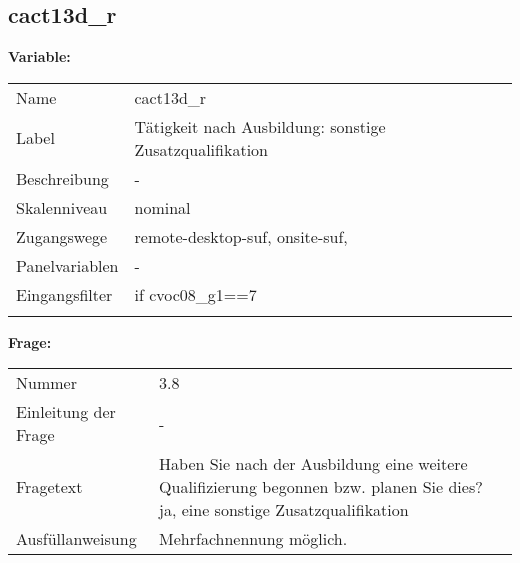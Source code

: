 	
	
	\subsection{cact13d\_r}
	\label{subSection:cact13d_r}

	\noindent\textbf{Variable:}\\
		\begin{tabular}{lL{11.3cm}}
			\label{tableVariable:cact13d_r}
			Name & cact13d\_r \\
			Label & Tätigkeit nach Ausbildung: sonstige Zusatzqualifikation \\
			Beschreibung & - \\
			Skalenniveau & nominal \\
			Zugangswege &
				remote-desktop-suf,
				onsite-suf,
 \\
			Panelvariablen & -
			 \\
			Eingangsfilter & if cvoc08\_g1==7 \\
 \\
		\end{tabular}

		\vspace*{1 cm}
		\noindent\textbf{Frage:}\\
		\begin{tabular}{lL{11.3cm}}
			\label{tableQuestion:cact13d_r}
			Nummer & 3.8 \\
			Einleitung der Frage & - \\
			Fragetext & Haben Sie nach der Ausbildung eine weitere Qualifizierung begonnen bzw. planen Sie dies?
ja, eine sonstige Zusatzqualifikation \\
			Ausfüllanweisung & Mehrfachnennung möglich. \\
		\end{tabular}





